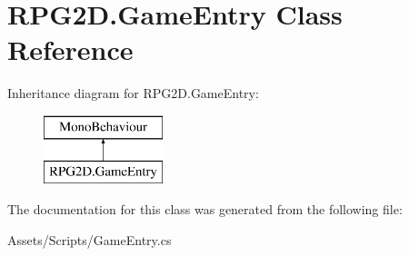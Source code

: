 \hypertarget{class_r_p_g2_d_1_1_game_entry}{}\section{R\+P\+G2\+D.\+Game\+Entry Class Reference}
\label{class_r_p_g2_d_1_1_game_entry}
Inheritance diagram for R\+P\+G2\+D.\+Game\+Entry\+:\begin{figure}[H]
\begin{center}
\leavevmode
\includegraphics[height=2.000000cm]{class_r_p_g2_d_1_1_game_entry}
\end{center}
\end{figure}


The documentation for this class was generated from the following file\+:\begin{DoxyCompactItemize}
\item 
Assets/\+Scripts/Game\+Entry.\+cs\end{DoxyCompactItemize}
